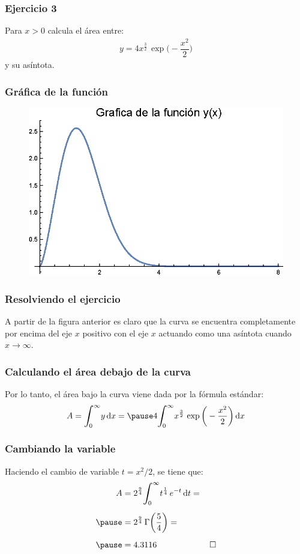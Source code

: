 \documentclass[12pt]{beamer}
\begin{document}
\begin{frame}
\frametitle{Ejercicio 3}
Para $x > 0$ calcula el área entre:
\begin{align*}
y = 4 x^{\frac{3}{2}} \, \exp \bigg( - \dfrac{x^{2}}{2} \bigg)
\end{align*}
y su asíntota.
\end{frame}
\begin{frame}
\frametitle{Gráfica de la función}
\begin{figure}
  \centering
  \includegraphics[scale=1]{Imagenes/Plot_Gamma_02_Ejercicio.eps}
\end{figure}
\end{frame}
\begin{frame}
\frametitle{Resolviendo el ejercicio}
A partir de la figura anterior es claro que la curva se encuentra completamente por encima del eje $x$ positivo con el eje $x$ actuando como una asíntota cuando $x \to \infty$.
\end{frame}
\begin{frame}
\frametitle{Calculando el área debajo de la curva}
Por lo tanto, el área bajo la curva viene dada por la fórmula estándar:
\pause
\begin{eqnarray*}
A = \scaleint{6ex}_{\bs 0}^{\infty} y \dd{x} = \pause 4 \scaleint{6ex}_{\bs 0}^{\infty} x^{\frac{3}{2}} \, \exp\bigg( -\dfrac{x^{2}}{2} \bigg) \dd{x}
\end{eqnarray*}
\end{frame}
\begin{frame}
\frametitle{Cambiando la variable}
Haciendo el cambio de variable $t = x^{2} / 2$, se tiene que:
\pause
\begin{eqnarray*}
\begin{aligned}
A &= 2^{\frac{9}{4}} \scaleint{6ex}_{\bs 0}^{\infty} t^{\frac{1}{4}} \, e^{-t} \dd{t} = \\[0.5em] \pause
&= 2^{\frac{9}{4}} \, \Gamma \bigg( \dfrac{5}{4} \bigg) = \\[0.5em] \pause
&= 4.3116 \hspace{1.5cm} \qed
\end{aligned}
\end{eqnarray*}
\end{frame}
\end{document}
